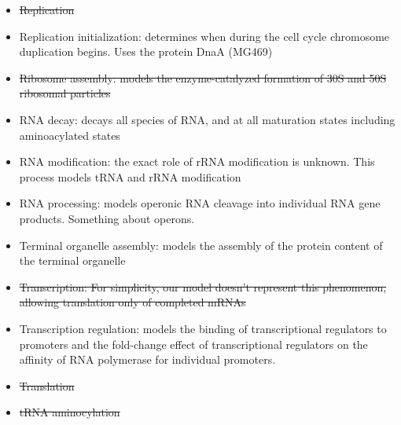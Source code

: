 \begin{itemize}
  \item \sout{Replication}
  \item Replication initialization: determines when during the cell cycle chromosome duplication begins. Uses the protein DnaA (MG469)
  \item \sout{Ribosome assembly:  models the enzyme-catalyzed formation of 30S and 50S ribosomal particles}
  \item RNA decay: decays all species of RNA, and at all maturation states including aminoacylated states
  \item RNA modification: the exact role of rRNA modification is unknown. This process models tRNA and rRNA modification
  \item RNA processing:  models operonic RNA cleavage into individual RNA gene products. Something about operons.
  \item Terminal organelle assembly: models the assembly of the protein content of the terminal organelle
  \item \sout{Transcription: For simplicity, our model doesn’t represent this phenomenon, allowing translation only of completed mRNAs}
  \item Transcription regulation: models the binding of transcriptional regulators to promoters and the fold-change effect of transcriptional regulators on the affinity of RNA polymerase for individual promoters.
  \item \sout{Translation}
  \item \sout{tRNA aminocylation}
\end{itemize}